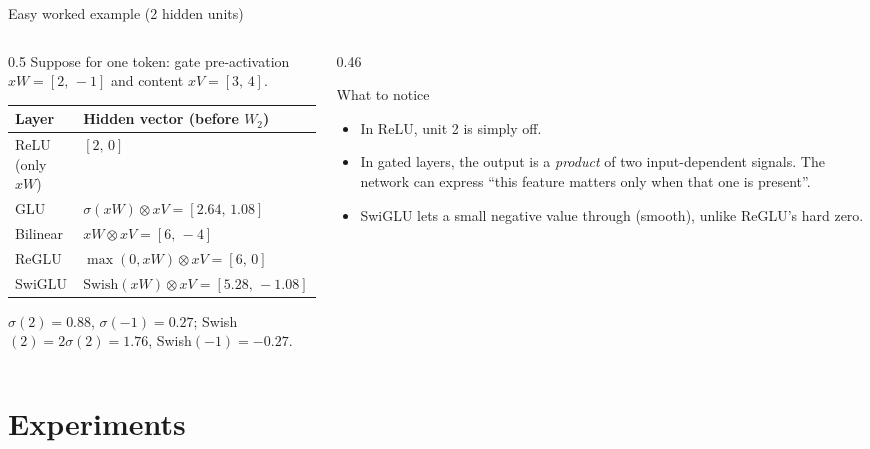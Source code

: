 \documentclass[aspectratio=169,11pt]{beamer}
\begin{document}
\begin{frame}{Easy worked example (2 hidden units)}
  \begin{columns}[T]
    \begin{column}{0.5\textwidth}
      \small
      Suppose for one token: gate pre-activation $xW=[2,\,-1]$ and content $xV=[3,\,4]$.
      \vspace{1mm}

      \scriptsize
      \begin{tabular}{@{}ll@{}}
        \toprule
        Layer & Hidden vector (before $W_2$)\\
        \midrule
        ReLU (only $xW$) & $[2,\,0]$\\
        GLU & $\sigma(xW)\otimes xV=[2.64,\,1.08]$\\
        Bilinear & $xW\otimes xV=[6,\,-4]$\\
        ReGLU & $\max(0,xW)\otimes xV=[6,\,0]$\\
        SwiGLU & $\text{Swish}(xW)\otimes xV=[5.28,\,-1.08]$\\
        \bottomrule
      \end{tabular}
      \vspace{1mm}

      {\scriptsize $\sigma(2)=0.88$, $\sigma(-1)=0.27$; Swish$(2)=2\sigma(2)=1.76$, Swish$(-1)=-0.27$.}
    \end{column}
    \begin{column}{0.46\textwidth}
      \begin{exampleblock}{What to notice}
        \small
        \begin{itemize}
          \item In ReLU, unit 2 is simply off.
          \item In gated layers, the output is a \emph{product} of two input-dependent signals. The network can express ``this feature matters only when that one is present''.
          \item SwiGLU lets a small negative value through (smooth), unlike ReGLU's hard zero.
        \end{itemize}
      \end{exampleblock}
    \end{column}
  \end{columns}
\end{frame}

\section{Experiments}
\end{document}
